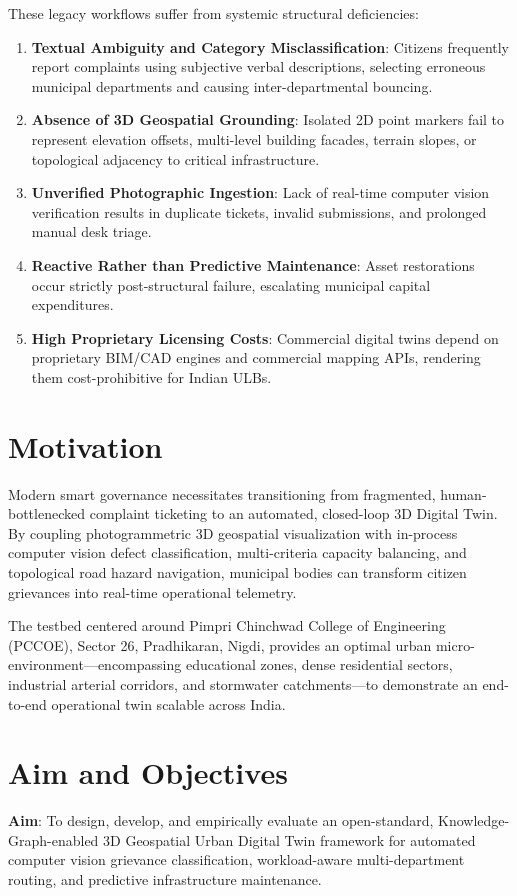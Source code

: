 \documentclass[12pt,a4paper]{report}
\begin{document}
These legacy workflows suffer from systemic structural deficiencies:
\begin{enumerate}[label=\arabic*.]
    \item \textbf{Textual Ambiguity and Category Misclassification}: Citizens frequently report complaints using subjective verbal descriptions, selecting erroneous municipal departments and causing inter-departmental bouncing.
    \item \textbf{Absence of 3D Geospatial Grounding}: Isolated 2D point markers fail to represent elevation offsets, multi-level building facades, terrain slopes, or topological adjacency to critical infrastructure.
    \item \textbf{Unverified Photographic Ingestion}: Lack of real-time computer vision verification results in duplicate tickets, invalid submissions, and prolonged manual desk triage.
    \item \textbf{Reactive Rather than Predictive Maintenance}: Asset restorations occur strictly post-structural failure, escalating municipal capital expenditures.
    \item \textbf{High Proprietary Licensing Costs}: Commercial digital twins depend on proprietary BIM/CAD engines and commercial mapping APIs, rendering them cost-prohibitive for Indian ULBs.
\end{enumerate}

\section{Motivation}
Modern smart governance necessitates transitioning from fragmented, human-bottlenecked complaint ticketing to an automated, closed-loop 3D Digital Twin. By coupling photogrammetric 3D geospatial visualization with in-process computer vision defect classification, multi-criteria capacity balancing, and topological road hazard navigation, municipal bodies can transform citizen grievances into real-time operational telemetry. 

The testbed centered around Pimpri Chinchwad College of Engineering (PCCOE), Sector 26, Pradhikaran, Nigdi, provides an optimal urban micro-environment—encompassing educational zones, dense residential sectors, industrial arterial corridors, and stormwater catchments—to demonstrate an end-to-end operational twin scalable across India.

\section{Aim and Objectives}
\textbf{Aim}: To design, develop, and empirically evaluate an open-standard, Knowledge-Graph-enabled 3D Geospatial Urban Digital Twin framework for automated computer vision grievance classification, workload-aware multi-department routing, and predictive infrastructure maintenance.
\end{document}
